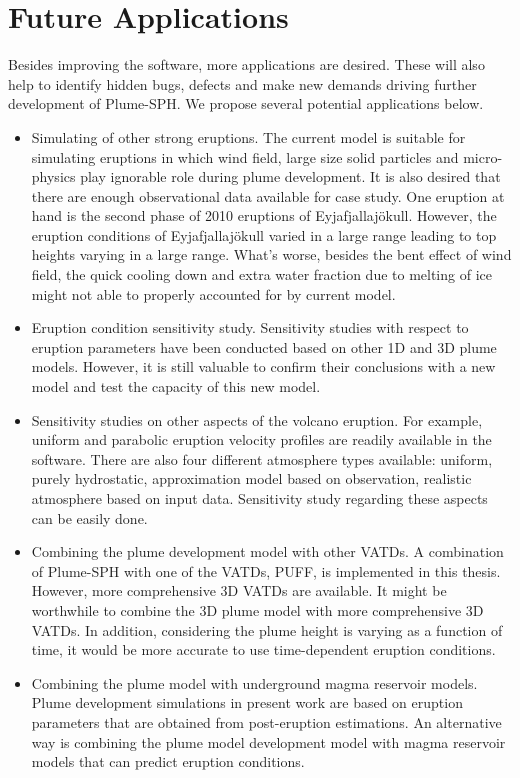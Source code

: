 \section{Future Applications}
Besides improving the software, more applications are desired. These will also help to identify hidden bugs, defects and make new demands driving further development of Plume-SPH.
We propose several potential applications below.
\begin{itemize}
\item Simulating of other strong eruptions. The current model is suitable for simulating eruptions in which wind field, large size solid particles and micro-physics play ignorable role during plume development. It is also desired that there are enough observational data available for case study. One eruption at hand is the second phase of 2010 eruptions of Eyjafjallajökull. However, the eruption conditions of Eyjafjallajökull varied in a large range leading to top heights varying in a large range. What's worse, besides the bent effect of wind field, the quick cooling down and extra water fraction due to melting of ice might not able to properly accounted for by current model.
\item Eruption condition sensitivity study. Sensitivity studies with respect to eruption parameters have been conducted based on other 1D and 3D plume models. However, it is still valuable to confirm their conclusions with a new model and test the capacity of this new model.
\item Sensitivity studies on other aspects of the volcano eruption. For example, uniform and parabolic eruption velocity profiles are readily available in the software. There are also four different atmosphere types available: uniform, purely hydrostatic, approximation model based on observation, realistic atmosphere based on input data. Sensitivity study regarding these aspects can be easily done.
\item Combining the plume development model with other VATDs. A combination of Plume-SPH with one of the VATDs, PUFF, is implemented in this thesis. However, more comprehensive 3D VATDs are available. It might be worthwhile to combine the 3D plume model with more comprehensive 3D VATDs. In addition, considering the plume height is varying as a function of time, it would be more accurate to use time-dependent eruption conditions.
\item Combining the plume model with underground magma reservoir models. Plume development simulations in present work are based on eruption parameters that are obtained from post-eruption estimations. An alternative way is combining the plume model development model with magma reservoir models that can predict eruption conditions.

\end{itemize}

